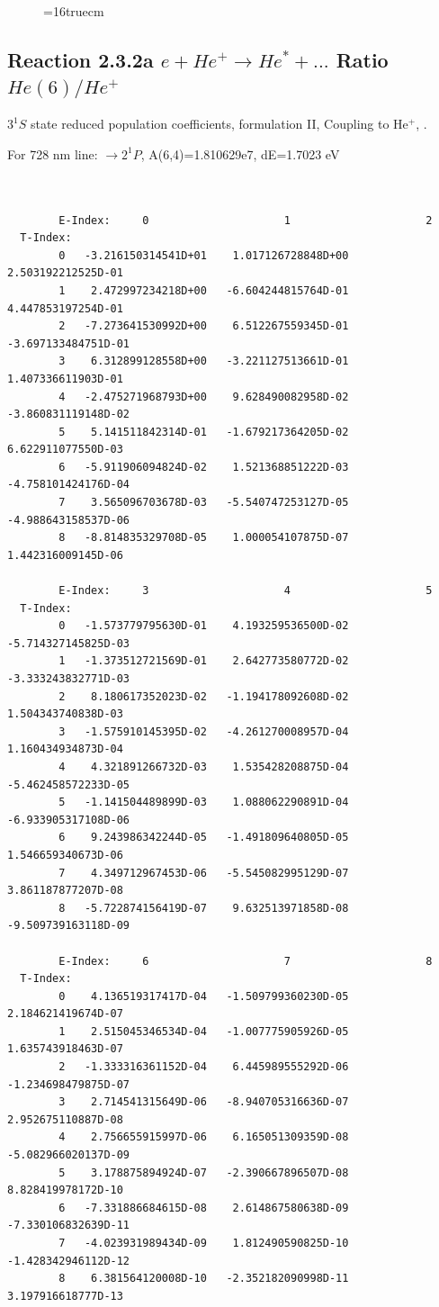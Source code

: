\documentclass[12pt,dvips]{article}
\begin{document}
\begin{figure} \label{2.2e}
\epsfxsize=16truecm
\end{figure}
\newpage


\subsection{
  Reaction 2.3.2a $e + He^+ \rightarrow He^* + ... $ Ratio $He(6)/He^+$
}

  $3^1S$ state
  reduced population coefficients, formulation II,
  Coupling to He$^+$, \cite{kn:Fujimoto}.

  For 728 nm line:  $\rightarrow 2^1P$, A(6,4)=1.810629e7, dE=1.7023 eV

\begin{small}\begin{verbatim}


        E-Index:     0                     1                     2
  T-Index:
        0   -3.216150314541D+01    1.017126728848D+00    2.503192212525D-01
        1    2.472997234218D+00   -6.604244815764D-01    4.447853197254D-01
        2   -7.273641530992D+00    6.512267559345D-01   -3.697133484751D-01
        3    6.312899128558D+00   -3.221127513661D-01    1.407336611903D-01
        4   -2.475271968793D+00    9.628490082958D-02   -3.860831119148D-02
        5    5.141511842314D-01   -1.679217364205D-02    6.622911077550D-03
        6   -5.911906094824D-02    1.521368851222D-03   -4.758101424176D-04
        7    3.565096703678D-03   -5.540747253127D-05   -4.988643158537D-06
        8   -8.814835329708D-05    1.000054107875D-07    1.442316009145D-06

        E-Index:     3                     4                     5
  T-Index:
        0   -1.573779795630D-01    4.193259536500D-02   -5.714327145825D-03
        1   -1.373512721569D-01    2.642773580772D-02   -3.333243832771D-03
        2    8.180617352023D-02   -1.194178092608D-02    1.504343740838D-03
        3   -1.575910145395D-02   -4.261270008957D-04    1.160434934873D-04
        4    4.321891266732D-03    1.535428208875D-04   -5.462458572233D-05
        5   -1.141504489899D-03    1.088062290891D-04   -6.933905317108D-06
        6    9.243986342244D-05   -1.491809640805D-05    1.546659340673D-06
        7    4.349712967453D-06   -5.545082995129D-07    3.861187877207D-08
        8   -5.722874156419D-07    9.632513971858D-08   -9.509739163118D-09

        E-Index:     6                     7                     8
  T-Index:
        0    4.136519317417D-04   -1.509799360230D-05    2.184621419674D-07
        1    2.515045346534D-04   -1.007775905926D-05    1.635743918463D-07
        2   -1.333316361152D-04    6.445989555292D-06   -1.234698479875D-07
        3    2.714541315649D-06   -8.940705316636D-07    2.952675110887D-08
        4    2.756655915997D-06    6.165051309359D-08   -5.082966020137D-09
        5    3.178875894924D-07   -2.390667896507D-08    8.828419978172D-10
        6   -7.331886684615D-08    2.614867580638D-09   -7.330106832639D-11
        7   -4.023931989434D-09    1.812490590825D-10   -1.428342946112D-12
        8    6.381564120008D-10   -2.352182090998D-11    3.197916618777D-13


\end{verbatim}
\end{small}
\end{document}
